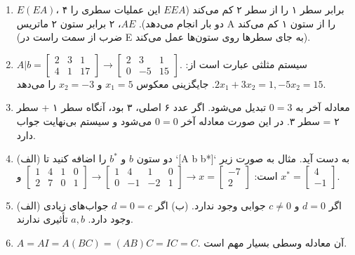 \documentclass[12pt]{article}
\begin{document}
\begin{enumerate}
		\item $E(EA)$، ۴ برابر سطر ۱ را از سطر ۲ کم می‌کند ($EEA$ این عملیات سطری را دو بار انجام می‌دهد). $AE$، ۲ برابر ستون ۲ ماتریس A را از ستون ۱ کم می‌کند (ضرب از سمت راست در E به جای سطرها روی ستون‌ها عمل می‌کند).
		
		\item $A|b = \begin{bmatrix} 2 & 3 & 1 \\ 4 & 1 & 17 \end{bmatrix} \to \begin{bmatrix} 2 & 3 & 1 \\ 0 & -5 & 15 \end{bmatrix}$. سیستم مثلثی عبارت است از: $2x_1+3x_2= 1, -5x_2=15$. جایگزینی معکوس $x_1=5$ و $x_2=-3$ را می‌دهد.
		
		\item معادله آخر به $0=3$ تبدیل می‌شود. اگر عدد ۶ اصلی، ۳ بود، آنگاه سطر ۱ + سطر ۲ = سطر ۳. در این صورت معادله آخر $0=0$ می‌شود و سیستم بی‌نهایت جواب دارد.
		
		\item (الف) دو ستون $b$ و $b^*$ را اضافه کنید تا `[A b b*]` به دست آید. مثال به صورت زیر است:
		$\begin{bmatrix} 1 & 4 & 1 & 0 \\ 2 & 7 & 0 & 1 \end{bmatrix} \to \begin{bmatrix} 1 & 4 & 1 & 0 \\ 0 & -1 & -2 & 1 \end{bmatrix} \to x = \begin{bmatrix} -7 \\ 2 \end{bmatrix}$ و $x^* = \begin{bmatrix} 4 \\ -1 \end{bmatrix}$.
		
		\item (الف) اگر $d=0$ و $c \neq 0$ جوابی وجود ندارد. (ب) اگر $d=0=c$ جواب‌های زیادی وجود دارد. $a, b$ تأثیری ندارند.
		
		\item $A=AI=A(BC)=(AB)C=IC=C$. آن معادله وسطی بسیار مهم است.
		

\end{enumerate}
\end{document}

